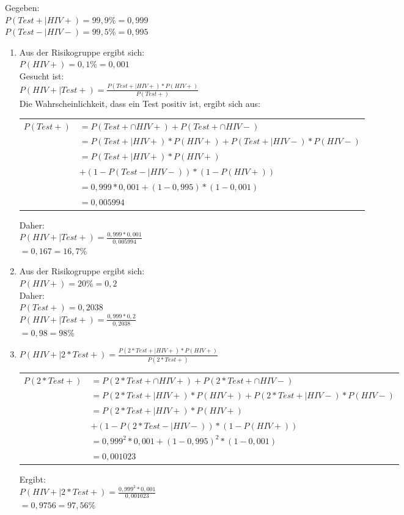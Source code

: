 \documentclass{homework}
\begin{document}
\begin{enumerate}
Gegeben:\\
$P(Test+ | HIV+) = 99,9$\%$ = 0,999$\\
$P(Test- | HIV-) = 99,5$\%$ = 0,995$\\
\begin{enumerate}
\item 
Aus der Risikogruppe ergibt sich:\\
$P(HIV+) = 0,1$\%$ = 0,001$\\
Gesucht ist:\\
$P(HIV+ | Test+) = \frac{P(Test+ | HIV+) * P(HIV+)}{P(Test+)}$\\
Die Wahrscheinlichkeit, dass ein Test positiv ist, ergibt sich aus:\\
\begin{tabular}{l l}
$P(Test+)$ & $= P(Test+ \cap HIV+) + P(Test+ \cap HIV-)$ \\ 
 & $= P(Test+ | HIV+) * P(HIV+) + P(Test+ | HIV-) * P(HIV-)$ \\ 
 & $= P(Test+ | HIV+) * P(HIV+)$ \\
 & $+ (1-P(Test- | HIV-)) * (1-P(HIV+))$\\
 & $= 0,999 * 0,001 + (1-0,995)*(1-0,001)$\\
 & $= 0,005994$\\
\end{tabular} 
Daher: \\
	$P(HIV+ | Test+) = \frac{0,999*0,001}{0,005994}$\\
	$ = 0,167 = 16,7$\% 
\item
Aus der Risikogruppe ergibt sich:\\
$P(HIV+) = 20$\%$ = 0,2$\\
Daher: \\
$P(Test+) = 0,2038$\\
$P(HIV+ | Test+) = \frac{0,999*0,2}{0,2038}$\\
	$ = 0,98 = 98$\% 
\item
	$P(HIV+ | 2*Test+) = \frac{P(2*Test+| HIV+) * P(HIV+)}{P(2*Test+)} $\\
\begin{tabular}{l l}
$P(2*Test+)$ & $= P(2*Test+ \cap HIV+) + P(2*Test+ \cap HIV-)$ \\ 
 & $= P(2*Test+ | HIV+) * P(HIV+) + P(2*Test+ | HIV-) * P(HIV-)$ \\ 
 & $= P(2*Test+ | HIV+) * P(HIV+)$ \\
 & $+ (1-P(2*Test- | HIV-)) * (1-P(HIV+))$\\
 & $= 0,999^2 * 0,001 + (1-0,995)^2*(1-0,001)$\\
 & $= 0,001023$
\end{tabular}
Ergibt: \\
$P(HIV+ | 2*Test+) = \frac{0,999^2*0,001}{0,001023}$\\
	$ = 0,9756 = 97,56$\% 
\end{enumerate}



\end{enumerate}
\end{document}
